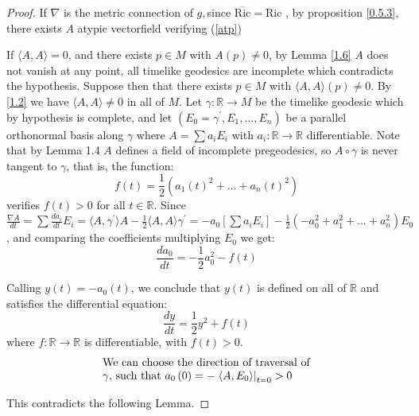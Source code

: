 \documentclass[10pt,a4paper]{amsart}
\begin{document}
\begin{proof}
If $\nabla$ is the metric connection of $g,$since $\overline{\mathrm{Ric}%
}=\mathrm{Ric}$ , by proposition \ref{0.5.3}, there exists $A$ atypic
vectorfield verifying (\ref{atp})

If $\langle A,A\rangle=0$, and there exists $p\in M$ with $A(p)\neq0$, by
Lemma \ref{1.6} $A$ does not vanish at any point, all timelike geodesics are
incomplete which contradicts the hypothesis. Suppose then that there exists
$p\in M$ with $\langle A,A\rangle(p)\neq0$. By \ref{1.2} we have $\langle
A,A\rangle\neq0$ in all of $M$. Let $\gamma:\mathbb{R}\longrightarrow M$ be
the timelike geodesic which by hypothesis is complete, and let $(E_{0}%
=\gamma^{\prime},E_{1},...,E_{n})$ be a parallel orthonormal basis along
$\gamma$ where $A=\sum a_{i}E_{i}$ with $a_{i}:\mathbb{R}\rightarrow
\mathbb{R}$ differentiable. Note that by Lemma 1.4 $A$ defines a field of
incomplete pregeodesics, so $A\circ\gamma$ is never tangent to $\gamma$, that
is, the function:
\[
f(t)=\frac{1}{2}(a_{1}(t)^{2}+...+a_{n}(t)^{2})
\]
verifies $f(t)>0$ for all $t\in\mathbb{R}$. Since $\frac{\nabla A}{dt}%
=\sum\frac{da_{i}}{dt}E_{i}=\langle A,\gamma^{\prime}\rangle A-\frac{1}%
{2}\langle A,A\rangle\gamma^{\prime}=-a_{0}[\sum a_{i}E_{i}]-\frac{1}%
{2}(-a_{0}^{2}+a_{1}^{2}+...+a_{n}^{2})E_{0}$, and comparing the coefficients
multiplying $E_{0}$ we get:
\[
\frac{da_{0}}{dt}=-\frac{1}{2}a_{0}^{2}-f(t)
\]


Calling $y(t)=-a_{0}(t)$, we conclude that $y(t)$ is defined on all of
$\mathbb{R}$ and satisfies the differential equation:
\begin{equation}
\frac{dy}{dt}=\frac{1}{2}y^{2}+f(t) \label{EDO}%
\end{equation}
where $f:\mathbb{R}\longrightarrow\mathbb{R}$ is differentiable, with
$f(t)>0$.
\[%
\begin{tabular}
[c]{l}%
We can choose the direction of traversal of\\
$\gamma$, such that $a_{0}\left(  0\right)  =-\left.  \left\langle
A,E_{0}\right\rangle \right\vert _{t=0}>0$%
\end{tabular}
\]


This contradicts the following Lemma.
\end{proof}
\end{document}
